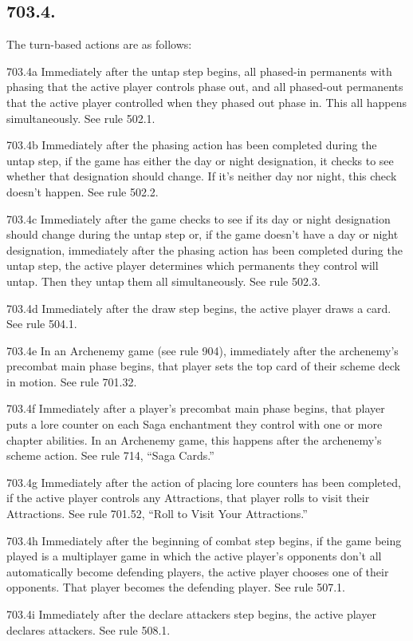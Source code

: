 \subsection*{703.4.}
The turn-based actions are as follows:

703.4a Immediately after the untap step begins, all phased-in permanents with phasing that the active player controls phase out, and all phased-out permanents that the active player controlled when they phased out phase in. This all happens simultaneously. See rule 502.1.

703.4b Immediately after the phasing action has been completed during the untap step, if the game has either the day or night designation, it checks to see whether that designation should change. If it’s neither day nor night, this check doesn’t happen. See rule 502.2.

703.4c Immediately after the game checks to see if its day or night designation should change during the untap step or, if the game doesn’t have a day or night designation, immediately after the phasing action has been completed during the untap step, the active player determines which permanents they control will untap. Then they untap them all simultaneously. See rule 502.3.

703.4d Immediately after the draw step begins, the active player draws a card. See rule 504.1.

703.4e In an Archenemy game (see rule 904), immediately after the archenemy’s precombat main phase begins, that player sets the top card of their scheme deck in motion. See rule 701.32.

703.4f Immediately after a player’s precombat main phase begins, that player puts a lore counter on each Saga enchantment they control with one or more chapter abilities. In an Archenemy game, this happens after the archenemy’s scheme action. See rule 714, “Saga Cards.”

703.4g Immediately after the action of placing lore counters has been completed, if the active player controls any Attractions, that player rolls to visit their Attractions. See rule 701.52, “Roll to Visit Your Attractions.”

703.4h Immediately after the beginning of combat step begins, if the game being played is a multiplayer game in which the active player’s opponents don’t all automatically become defending players, the active player chooses one of their opponents. That player becomes the defending player. See rule 507.1.

703.4i Immediately after the declare attackers step begins, the active player declares attackers. See rule 508.1.

